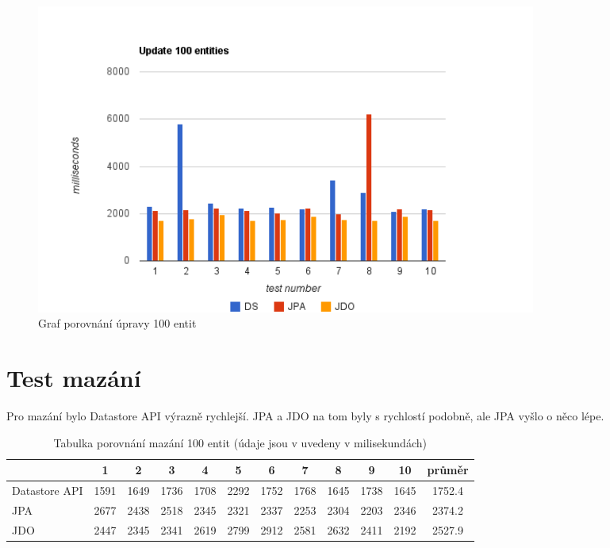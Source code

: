 \begin{figure}[h]
\begin{center}
\includegraphics[width=6.5in]{figures/update.png}
\caption{Graf porovnání úpravy 100 entit}
\label{fig:update}
\end{center}
\end{figure}


\section{Test mazání}

Pro mazání bylo Datastore API výrazně rychlejší. JPA a JDO na tom byly s rychlostí podobně, ale JPA vyšlo o něco lépe.

\begin{table}[h]
\centering
\caption{Tabulka porovnání mazání 100 entit (údaje jsou v uvedeny v milisekundách)}\label{tab:delete}
\begin{tabular}{|l|c|c|c|c|c|c|c|c|c|c|c|}
   \hline
	& 1		& 2		& 3		& 4		& 5		& 6		& 7		& 8		& 9		& 10		& průměr \\
   \hline
Datastore API	& 1591	& 1649	& 1736	& 1708	& 2292	& 1752	& 1768	& 1645	& 1738	& 1645	& 1752.4 \\
JPA	& 2677	& 2438	& 2518	& 2345	& 2321	& 2337	& 2253	& 2304	& 2203	& 2346	& 2374.2 \\
JDO	& 2447	& 2345	& 2341	& 2619	& 2799	& 2912	& 2581	& 2632	& 2411	& 2192	& 2527.9 \\
   \hline
\end{tabular}
\end{table}

